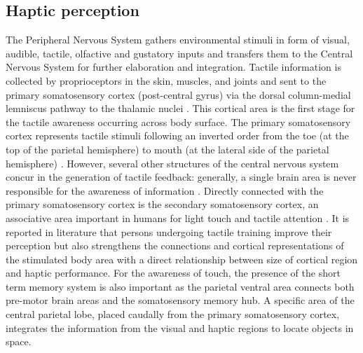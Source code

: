 \documentclass{vgtc}
\begin{document}
\subsection{Haptic perception}
The Peripheral Nervous System gathers environmental stimuli in form of visual, audible, tactile, olfactive and gustatory inputs and transfers them to the Central Nervous System for further elaboration and integration. Tactile information is collected by proprioceptors in the skin, muscles, and joints and sent to the primary somatosensory cortex (post-central gyrus) via the dorsal column-medial lemniscus pathway to the thalamic nuclei \cite{Blatow2007}. This cortical area is the first stage for the tactile awareness occurring across body surface. The primary somatosensory cortex represents tactile stimuli following an inverted order from the toe (at the top of the parietal hemisphere) to mouth (at the lateral side of the parietal hemisphere) \cite{Narici1999}. However, several other structures of the central nervous system concur in the generation of tactile feedback: generally, a single brain area is never responsible for the awareness of information \cite{Manzoni1986}. Directly connected with the primary somatosensory cortex is the secondary somatosensory cortex, an associative area important in humans for light touch and tactile attention \cite{Eickhoff2005}. It is reported in literature that persons undergoing tactile training improve their perception but also strengthens the connections and cortical representations of the stimulated body area \cite{Saito2007} with a direct relationship between size of cortical region and haptic performance. For the awareness of touch, the presence of the short term memory system is also important \cite{Edelman1989} as the parietal ventral area connects both pre-motor brain areas and the somatosensory memory hub. A specific area of the central parietal lobe, placed caudally from the primary somatosensory cortex, integrates the information from the visual and haptic regions to locate objects in space. 
\end{document}
